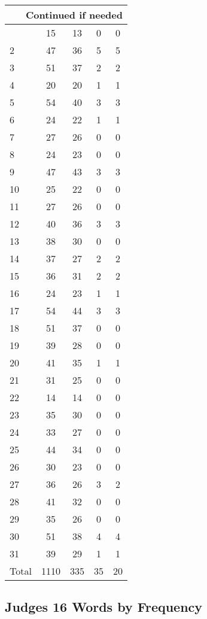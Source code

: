 \begin{center}
\begin{longtable}{l|c|c|c|c}
\hline \multicolumn{5}{|r|}{{Continued if needed}} \\ \hline
\endfoot 
1 & 15 & 13 & 0 & 0\\ \hline
2 & 47 & 36 & 5 & 5\\ \hline
3 & 51 & 37 & 2 & 2\\ \hline
4 & 20 & 20 & 1 & 1\\ \hline
5 & 54 & 40 & 3 & 3\\ \hline
6 & 24 & 22 & 1 & 1\\ \hline
7 & 27 & 26 & 0 & 0\\ \hline
8 & 24 & 23 & 0 & 0\\ \hline
9 & 47 & 43 & 3 & 3\\ \hline
10 & 25 & 22 & 0 & 0\\ \hline
11 & 27 & 26 & 0 & 0\\ \hline
12 & 40 & 36 & 3 & 3\\ \hline
13 & 38 & 30 & 0 & 0\\ \hline
14 & 37 & 27 & 2 & 2\\ \hline
15 & 36 & 31 & 2 & 2\\ \hline
16 & 24 & 23 & 1 & 1\\ \hline
17 & 54 & 44 & 3 & 3\\ \hline
18 & 51 & 37 & 0 & 0\\ \hline
19 & 39 & 28 & 0 & 0\\ \hline
20 & 41 & 35 & 1 & 1\\ \hline
21 & 31 & 25 & 0 & 0\\ \hline
22 & 14 & 14 & 0 & 0\\ \hline
23 & 35 & 30 & 0 & 0\\ \hline
24 & 33 & 27 & 0 & 0\\ \hline
25 & 44 & 34 & 0 & 0\\ \hline
26 & 30 & 23 & 0 & 0\\ \hline
27 & 36 & 26 & 3 & 2\\ \hline
28 & 41 & 32 & 0 & 0\\ \hline
29 & 35 & 26 & 0 & 0\\ \hline
30 & 51 & 38 & 4 & 4\\ \hline
31 & 39 & 29 & 1 & 1\\ \hline
Total & 1110 & 335 & 35 & 20
\end{longtable}
\end{center}





\subsection{Judges 16 Words by Frequency}


